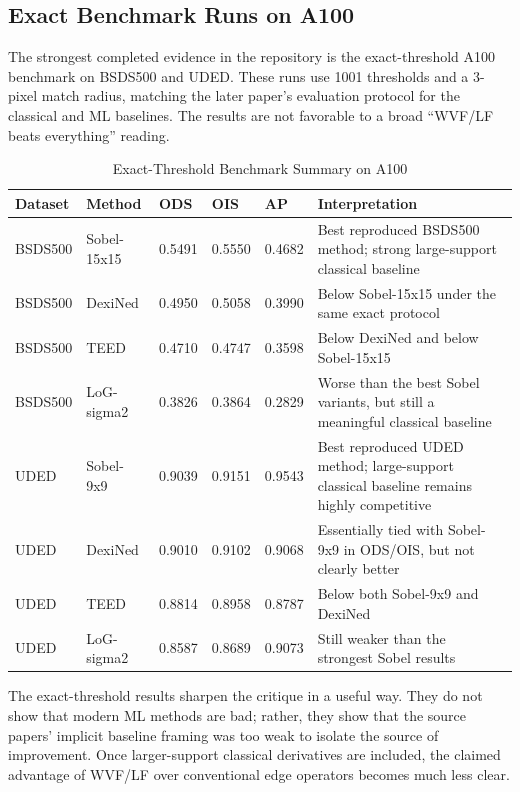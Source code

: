 \documentclass[conference]{IEEEtran}
\begin{document}
\subsection{Exact Benchmark Runs on A100}

The strongest completed evidence in the repository is the exact-threshold A100 benchmark on BSDS500 and UDED. These runs use 1001 thresholds and a 3-pixel match radius, matching the later paper's evaluation protocol for the classical and ML baselines. The results are not favorable to a broad ``WVF/LF beats everything'' reading.

\begin{table}[t]
\centering
\caption{Exact-Threshold Benchmark Summary on A100}
\label{tab:exact}
\scriptsize
\begin{tabular}{P{1.6cm}P{2.5cm}P{2.3cm}P{2.3cm}P{2.0cm}P{4.4cm}}
\toprule
Dataset & Method & ODS & OIS & AP & Interpretation \\
\midrule
BSDS500 & Sobel-15x15 & 0.5491 & 0.5550 & 0.4682 & Best reproduced BSDS500 method; strong large-support classical baseline \\
BSDS500 & DexiNed & 0.4950 & 0.5058 & 0.3990 & Below Sobel-15x15 under the same exact protocol \\
BSDS500 & TEED & 0.4710 & 0.4747 & 0.3598 & Below DexiNed and below Sobel-15x15 \\
BSDS500 & LoG-sigma2 & 0.3826 & 0.3864 & 0.2829 & Worse than the best Sobel variants, but still a meaningful classical baseline \\
UDED & Sobel-9x9 & 0.9039 & 0.9151 & 0.9543 & Best reproduced UDED method; large-support classical baseline remains highly competitive \\
UDED & DexiNed & 0.9010 & 0.9102 & 0.9068 & Essentially tied with Sobel-9x9 in ODS/OIS, but not clearly better \\
UDED & TEED & 0.8814 & 0.8958 & 0.8787 & Below both Sobel-9x9 and DexiNed \\
UDED & LoG-sigma2 & 0.8587 & 0.8689 & 0.9073 & Still weaker than the strongest Sobel results \\
\bottomrule
\end{tabular}
\end{table}

The exact-threshold results sharpen the critique in a useful way. They do not show that modern ML methods are bad; rather, they show that the source papers' implicit baseline framing was too weak to isolate the source of improvement. Once larger-support classical derivatives are included, the claimed advantage of WVF/LF over conventional edge operators becomes much less clear.
\end{document}
